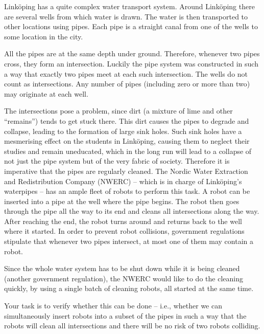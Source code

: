 
%
\noindent
Linköping has a quite complex water transport system.
Around Linköping there are several wells from which water is drawn.
The water is then transported to other locations using pipes.
Each pipe is a straight canal from one of the wells to some location in the city.

All the pipes are at the same depth under ground.
Therefore, whenever two pipes cross, they form an intersection.
Luckily the pipe system was constructed in such a way that exactly two pipes meet at each such intersection.
The wells do not count as intersections.
Any number of pipes (including zero or more than two) may originate at each well.

The intersections pose a problem, since dirt (a mixture of lime and
other ``remains'') tends to get stuck there.  This dirt causes the
pipes to degrade and collapse, leading to the formation of large sink
holes.  Such sink holes have a mesmerising effect on the students in
Linköping, causing them to neglect their studies and remain
uneducated, which in the long run will lead to a collapse of not just
the pipe system but of the very fabric of society.
Therefore it is imperative that the pipes are regularly cleaned.
The Nordic Water Extraction and Redistribution Company (NWERC) --
which is in charge of Linköping's waterpipes -- has an ample fleet of robots to
perform this task. A robot can be inserted into a pipe at the well where the
pipe begins. The robot then goes through the pipe all the way to its end and 
cleans all intersections along the way. After reaching the end, the robot turns
around and returns back to the well where it started.
In order to prevent robot collisions, government regulations stipulate that
whenever two pipes intersect, at most one of them may contain a robot.

Since the whole water system has to be shut down while it is being cleaned 
(another government regulation), the NWERC would like to do the cleaning
quickly, by using a single batch of cleaning robots, all started at the same time.

Your task is to verify whether this can be done -- i.e., whether we can simultaneously 
insert robots into a subset of the pipes in such a way that the robots will clean 
all intersections and there will be no risk of two robots colliding.

